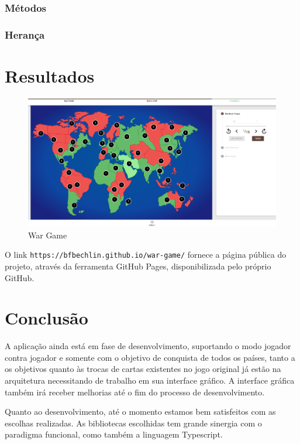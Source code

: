 \documentclass[rel_mlp]{iiufrgs}
\begin{document}
\subsection{Métodos}

\subsection{Herança}
  
\chapter{Resultados}
\begin{figure}[ht]
\centering
     \includegraphics[width=1.0\textwidth]{partialResults}
      \caption{War Game}
       \label{normal_case}
\end{figure}
\par O link \texttt{https://bfbechlin.github.io/war-game/} fornece a página pública do projeto, através da ferramenta GitHub Pages, disponibilizada pelo próprio GitHub.

\chapter{Conclusão}
A aplicação ainda está em fase de desenvolvimento, suportando o modo jogador contra jogador e somente com o objetivo de conquista de todos os países, tanto a os objetivos quanto às trocas de cartas existentes no jogo original já estão na arquitetura necessitando de trabalho em sua interface gráfico. A interface gráfica também irá receber melhorias até o fim do processo de desenvolvimento. \par
Quanto ao desenvolvimento, até o momento estamos bem satisfeitos com as escolhas realizadas. As bibliotecas escolhidas tem grande sinergia com o paradigma funcional, como também a linguagem Typescript.
\end{document}
